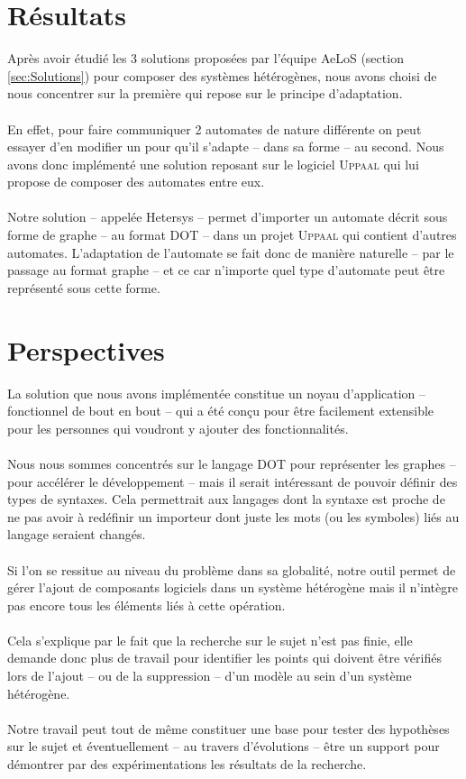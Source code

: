 \documentclass[12pt,a4paper]{report}
\begin{document}
\section{Résultats}
Après avoir étudié les 3 solutions proposées par l'équipe AeLoS (section \ref{sec:Solutions}) pour composer des systèmes hétérogènes, 
nous avons choisi de nous concentrer sur la première qui repose sur le principe d'adaptation.
\\\\
En effet, pour faire communiquer 2 automates de nature différente on peut essayer d'en modifier un 
pour qu'il s'adapte -- dans sa forme -- au second. Nous avons donc implémenté une solution reposant sur 
le logiciel \textsc{Uppaal} qui lui propose de composer des automates entre eux.
\\\\
Notre solution -- appelée Hetersys -- permet d'importer un automate décrit sous forme de graphe -- au format DOT --
dans un projet \textsc{Uppaal} qui contient d'autres automates. L'adaptation de l'automate se fait donc de manière naturelle
-- par le passage au format graphe -- et ce car n'importe quel type d'automate peut être représenté sous cette forme.

\section{Perspectives}
La solution que nous avons implémentée constitue un noyau d'application -- fonctionnel de bout en bout -- qui a été conçu 
pour être facilement extensible pour les personnes qui voudront y ajouter des fonctionnalités. 
\\\\
Nous nous sommes concentrés sur
le langage DOT pour représenter les graphes -- pour accélérer le développement -- mais il serait intéressant de pouvoir définir des types de syntaxes.
Cela permettrait aux langages dont la syntaxe est proche de ne pas avoir à redéfinir un importeur dont juste les mots (ou les symboles)
liés au langage seraient changés. 
\\\\
Si l'on se ressitue au niveau du problème dans sa globalité, notre outil permet de gérer l'ajout de composants logiciels
dans un système hétérogène mais il n'intègre pas encore tous les éléments liés à cette opération. 
\\\\
Cela s'explique par le fait que la recherche sur le sujet n'est pas finie, elle demande donc plus de travail pour identifier
les points qui doivent être vérifiés lors de l'ajout -- ou de la suppression -- d'un modèle au sein d'un système hétérogène.
\\\\
Notre travail peut tout de même constituer une base pour tester des hypothèses sur le sujet et éventuellement  -- au travers
d'évolutions -- être un support pour démontrer par des expérimentations les résultats de la recherche.



\end{document}
